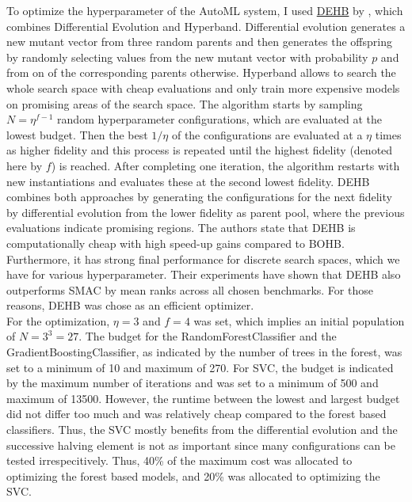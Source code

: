 \documentclass[11pt]{article}
\begin{document}
To optimize the hyperparameter of the AutoML system, I used \href{https://github.com/automl/dehb}{DEHB} by \citet{dehb}, which combines Differential Evolution and Hyperband. Differential evolution generates a new mutant vector from three random parents and then generates the offspring by randomly selecting values from the new mutant vector with probability $p$ and from on of the corresponding parents otherwise. Hyperband allows to search the whole search space with cheap evaluations and only train more expensive models on promising areas of the search space. The algorithm starts by sampling $N=\eta^{f-1}$ random hyperparameter configurations, which are evaluated at the lowest budget. Then the best $1/\eta$ of the configurations are evaluated at a $\eta$ times as higher fidelity and this process is repeated until the highest fidelity (denoted here by $f$) is reached. After completing one iteration, the algorithm restarts with new instantiations and evaluates these at the second lowest fidelity. DEHB combines both approaches by generating the configurations for the next fidelity by differential evolution from the lower fidelity as parent pool, where the previous evaluations indicate promising regions. The authors state that DEHB is computationally cheap with high speed-up gains compared to BOHB. Furthermore, it has strong final performance for discrete search spaces, which we have for various hyperparameter. Their experiments have shown that DEHB also outperforms SMAC by mean ranks across all chosen benchmarks. For those reasons, DEHB was chose as an efficient optimizer. \\

For the optimization, $\eta=3$ and $f=4$ was set, which implies an initial population of $N=3^{3}=27$. The budget for the RandomForestClassifier and the GradientBoostingClassifier, as indicated by the number of trees in the forest, was set to a minimum of 10 and maximum of 270. For SVC, the budget is indicated by the maximum number of iterations and was set to a minimum of 500 and maximum of 13500. However, the runtime between the lowest and largest budget did not differ too much and was relatively cheap compared to the forest based classifiers. Thus, the SVC mostly benefits from the differential evolution and the successive halving element is not as important since many configurations can be tested irrespecitively. Thus, 40\% of the maximum cost was allocated to optimizing the forest based models, and 20\% was allocated to optimizing the SVC. \\
\end{document}
